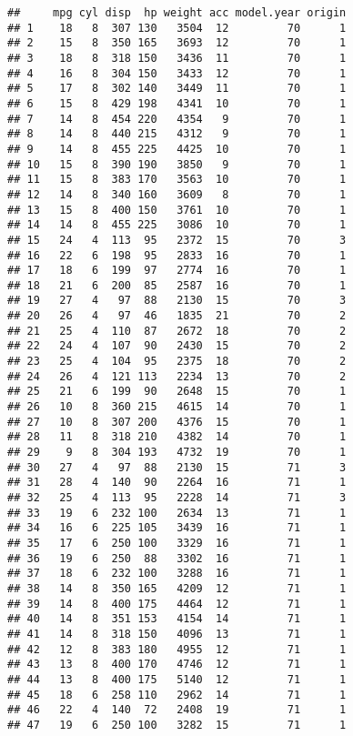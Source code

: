 \documentclass[]{article}
\begin{document}
\begin{verbatim}
##     mpg cyl disp  hp weight acc model.year origin
## 1    18   8  307 130   3504  12         70      1
## 2    15   8  350 165   3693  12         70      1
## 3    18   8  318 150   3436  11         70      1
## 4    16   8  304 150   3433  12         70      1
## 5    17   8  302 140   3449  11         70      1
## 6    15   8  429 198   4341  10         70      1
## 7    14   8  454 220   4354   9         70      1
## 8    14   8  440 215   4312   9         70      1
## 9    14   8  455 225   4425  10         70      1
## 10   15   8  390 190   3850   9         70      1
## 11   15   8  383 170   3563  10         70      1
## 12   14   8  340 160   3609   8         70      1
## 13   15   8  400 150   3761  10         70      1
## 14   14   8  455 225   3086  10         70      1
## 15   24   4  113  95   2372  15         70      3
## 16   22   6  198  95   2833  16         70      1
## 17   18   6  199  97   2774  16         70      1
## 18   21   6  200  85   2587  16         70      1
## 19   27   4   97  88   2130  15         70      3
## 20   26   4   97  46   1835  21         70      2
## 21   25   4  110  87   2672  18         70      2
## 22   24   4  107  90   2430  15         70      2
## 23   25   4  104  95   2375  18         70      2
## 24   26   4  121 113   2234  13         70      2
## 25   21   6  199  90   2648  15         70      1
## 26   10   8  360 215   4615  14         70      1
## 27   10   8  307 200   4376  15         70      1
## 28   11   8  318 210   4382  14         70      1
## 29    9   8  304 193   4732  19         70      1
## 30   27   4   97  88   2130  15         71      3
## 31   28   4  140  90   2264  16         71      1
## 32   25   4  113  95   2228  14         71      3
## 33   19   6  232 100   2634  13         71      1
## 34   16   6  225 105   3439  16         71      1
## 35   17   6  250 100   3329  16         71      1
## 36   19   6  250  88   3302  16         71      1
## 37   18   6  232 100   3288  16         71      1
## 38   14   8  350 165   4209  12         71      1
## 39   14   8  400 175   4464  12         71      1
## 40   14   8  351 153   4154  14         71      1
## 41   14   8  318 150   4096  13         71      1
## 42   12   8  383 180   4955  12         71      1
## 43   13   8  400 170   4746  12         71      1
## 44   13   8  400 175   5140  12         71      1
## 45   18   6  258 110   2962  14         71      1
## 46   22   4  140  72   2408  19         71      1
## 47   19   6  250 100   3282  15         71      1

\end{verbatim}
\end{document}
